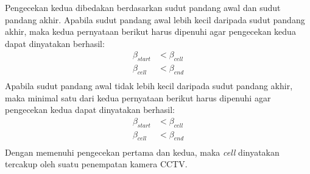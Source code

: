 Pengecekan kedua dibedakan berdasarkan sudut pandang awal dan sudut pandang akhir. Apabila sudut pandang awal lebih kecil daripada sudut pandang akhir, maka kedua pernyataan berikut harus dipenuhi agar pengecekan kedua dapat dinyatakan berhasil:
\begin{equation}
	\begin{split}
		\beta_{start} &< \beta_{cell}\\
		\beta_{cell} &< \beta_{end}\\
	\end{split}
\end{equation}
Apabila sudut pandang awal tidak lebih kecil daripada sudut pandang akhir, maka minimal satu dari kedua pernyataan berikut harus dipenuhi agar pengecekan kedua dapat dinyatakan berhasil:
\begin{equation}
	\begin{split}
		\beta_{start} &< \beta_{cell}\\
		\beta_{cell} &< \beta_{end}\\
	\end{split}
\end{equation}
Dengan memenuhi pengecekan pertama dan kedua, maka \textit{cell} dinyatakan tercakup oleh suatu penempatan kamera CCTV.

%
%

